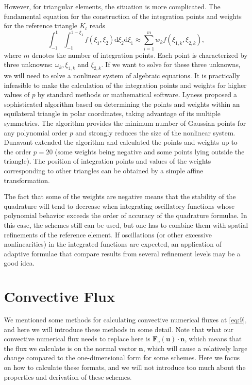 \documentclass{develop-note}
\begin{document}
However, for triangular elements, the situation is more complicated. The fundamental equation for the construction of the integration points and weights for the reference triangle $K_{t}$ reads
\begin{equation}
  \int_{-1}^{1}\int_{-1}^{1-\xi_{1}}f(\xi_{1},\xi_{2})\mathrm{d}\xi_{2}\mathrm{d}\xi_{1}\approx\sum_{i=1}^{m}w_{k}f(\xi_{1,k},\xi_{2,k}),
\end{equation}
where $m$ denotes the number of integration points. Each point is characterized by three unknowns: $\omega_{k},\xi_{1,k}$ and $\xi_{2,k}$. If we want to solve for these three unknowns, we will need to solve a nonlinear system of algebraic equations. It is practically infeasible to make the calculation of the integration points and weights for higher values of $p$ by standard methods or mathematical software. Lyness\cite{lynessModerateDegreeSymmetric1975} proposed a sophisticated algorithm based on determining the points and weights within an equilateral triangle in polar coordinates, taking advantage of its multiple symmetries. The algorithm provides the minimum number of Gaussian points for any polynomial order $p$ and strongly reduces the size of the nonlinear system. Dunavant\cite{dunavantHighDegreeEfficient1985} extended the algorithm and calculated the points and weights up to the order $p=20$ (some weights being negative and some points lying outside the triangle). The position of integration points and values of the weights corresponding to other triangles can be obtained by a simple affine transformation.

The fact that some of the weights are negative means that the stability of the quadrature will tend to decrease when integrating oscillatory functions whose polynomial behavior exceeds the order of accuracy of the quadrature formulae. In this case, the schemes still can be used, but one has to combine them with spatial refinements of the reference element. If oscillations (or other excessive nonlinearities) in the integrated functions are expected, an application of adaptive formulae that compare results from several refinement levels may be a good idea.

\section{Convective Flux}

We mentioned some methods for calculating convective numerical fluxes at \autoref{eq:9}, and here we will introduce these methods in some detail. Note that what our convective numerical flux needs to replace here is $\mathbf{F}_{\mathrm{e}}(\mathbf{u})\cdot\mathbf{n}$, which means that the flux we calculate is on the normal vector $\mathbf{n}$, which will cause a relatively large change compared to the one-dimensional form for some schemes. Here we focus on how to calculate these formats, and we will not introduce too much about the properties and derivation of these schemes.
\end{document}
